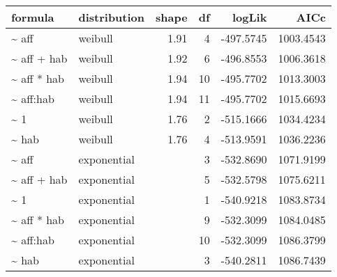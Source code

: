 \begin{table}[ht]
\centering
\begin{tabular}{llrrrr}
 formula & distribution & shape & df & logLik & AICc \\ 
  \hline
\~{} aff & weibull & 1.91 & 4 & -497.5745 & 1003.4543 \\ 
  \~{} aff + hab & weibull & 1.92 & 6 & -496.8553 & 1006.3618 \\ 
  \~{} aff * hab & weibull & 1.94 & 10 & -495.7702 & 1013.3003 \\ 
  \~{} aff:hab & weibull & 1.94 & 11 & -495.7702 & 1015.6693 \\ 
  \~{} 1 & weibull & 1.76 & 2 & -515.1666 & 1034.4234 \\ 
  \~{} hab & weibull & 1.76 & 4 & -513.9591 & 1036.2236 \\ 
  \~{} aff & exponential &  & 3 & -532.8690 & 1071.9199 \\ 
  \~{} aff + hab & exponential &  & 5 & -532.5798 & 1075.6211 \\ 
  \~{} 1 & exponential &  & 1 & -540.9218 & 1083.8734 \\ 
  \~{} aff * hab & exponential &  & 9 & -532.3099 & 1084.0485 \\ 
  \~{} aff:hab & exponential &  & 10 & -532.3099 & 1086.3799 \\ 
  \~{} hab & exponential &  & 3 & -540.2811 & 1086.7439 \\ 
  \end{tabular}
\label{tab:brach}
\end{table}
